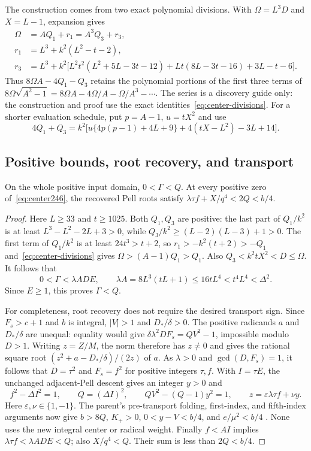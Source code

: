 The construction comes from two exact polynomial divisions.  With
$\Omega=L^3D$ and $X=L-1$, expansion gives
\begin{align}
 \Omega&=AQ_1+r_1=A^3Q_3+r_3,\label{eq:center-divisions}\\
 r_1&=L^3+k^2(L^2-t-2),\nonumber\\
 r_3&=L^3+k^2\bigl[L^2t^2(L^2+5L-3t-12)
             +Lt(8L-3t-16)+3L-t-6\bigr].\nonumber
\end{align}
Thus $8\Omega A-4Q_1-Q_3$ retains the polynomial portions of the
first three terms of
$8\Omega\sqrt{A^2-1}=8\Omega A-4\Omega/A-\Omega/A^3-\cdots$.
The series is a discovery guide only: the construction and proof use
the exact identities~\eqref{eq:center-divisions}.
For a shorter evaluation schedule, put $p=A-1$, $u=tX^2$ and use
\begin{equation}\label{eq:center-paid}
 4Q_1+Q_3=k^2\bigl[u\{4p(p-1)+4L+9\}
                    +4(tX-L^2)-3L+14\bigr].
\end{equation}

\subsection{Positive bounds, root recovery, and transport}

\begin{lemma}\label{lem:center-bounds}
On the whole positive input domain, $0<\Gamma<Q$.
At every positive zero of~\eqref{eq:center246}, the recovered Pell roots
satisfy $\lambda\tau f+X/q^4<2Q<b/4$.
\end{lemma}
\begin{proof}
Here $L\ge33$ and $t\ge1025$.  Both $Q_1,Q_3$ are positive:
the last part of $Q_1/k^2$ is at least
$L^3-L^2-2L+3>0$, while
$Q_3/k^2\ge(L-2)(L-3)+1>0$.
The first term of $Q_1/k^2$ is at least $24t^3>t+2$, so
$r_1>-k^2(t+2)>-Q_1$ and~\eqref{eq:center-divisions} gives
$\Omega>(A-1)Q_1>Q_1$.  Also $Q_3<k^2tX^2<D\le\Omega$.
It follows that
\[
 0<\Gamma<\lambda ADE,\qquad
 \lambda A=8L^3(tL+1)\le16tL^4<t^4L^4<\Delta^2.
\]
Since $E\ge1$, this proves $\Gamma<Q$.

For completeness, root recovery does not require the desired transport
sign.  Since $F_s>c+1$ and $b$ is integral, $|V|>1$ and $D_*/\delta>0$.
The positive radicands $a$ and $D_*/\delta$ are unequal: equality
would give $\delta\lambda^2DF_s=QV^2-1$, impossible modulo $D>1$.
Writing $z=Z/M$, the norm therefore has $z\ne0$ and gives the rational
square root $(z^2+a-D_*/\delta)/(2z)$ of $a$.
As $\lambda>0$ and $\gcd(D,F_s)=1$, it follows that
$D=\tau^2$ and $F_s=f^2$ for positive integers $\tau,f$.
With $I=\tau E$, the unchanged adjacent-Pell descent gives an integer
$y>0$ and
\[
 f^2-\Delta I^2=1,\qquad Q=(\Delta I)^2,\qquad
 QV^2-(Q-1)y^2=1,
 \qquad z=\varepsilon\lambda\tau f+\nu y.
\]
Here $\varepsilon,\nu\in\{1,-1\}$.
The parent's pre-transport folding, first-index, and fifth-index
arguments now give $b>8Q$, $K_+>0$,
$0<y-V<b/4$, and $e/\mu^2<b/4$ \cite{gapfusion}.
None uses the new integral center or radical weight.
Finally $f<AI$ implies $\lambda\tau f<\lambda ADE<Q$;
also $X/q^4<Q$.  Their sum is less than $2Q<b/4$.
\end{proof}

